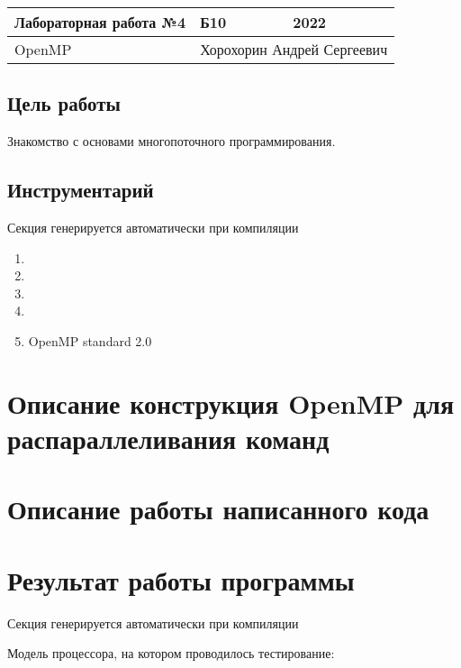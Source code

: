 \documentclass[14pt, russian, onesize]{extreport}
\begin{document}
\begin{tabular}{|p{8cm}|p{3cm}|p{3cm}|}
    \hline
    Лабораторная работа №4 & Б10 & 2022\\
    \hline
    OpenMP  & \multicolumn{2}{|c|}{Хорохорин Андрей Сергеевич}\\
    \hline
\end{tabular}
\subsection*{ Цель работы }
Знакомство с основами многопоточного программирования.
\subsection*{ Инструментарий }
Секция генерируется автоматически при компиляции
\begin{enumerate}
    \item {}
    \item {}
    \item {}
    \item {}
    \item OpenMP standard 2.0
\end{enumerate}

\section*{Описание конструкция OpenMP для распараллеливания команд}

\section*{Описание работы написанного кода}

\section*{Результат работы программы}
Секция генерируется автоматически при компиляции

Модель процессора, на котором проводилось тестирование:

\texttt{  }


\def\inputverbatim #1{\bgroup
  \def\do##1{\catcode`##1=12 }\dospecials
  \def\par{\endgraf\noindent\null}\obeylines\obeyspaces
  \tt \noindent
    
  \egroup
}
\end{document}
